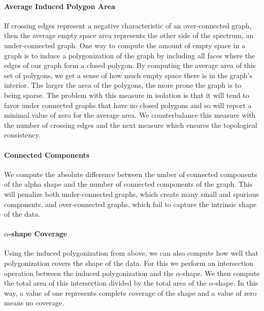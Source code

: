 \paragraph{\textbf{Average Induced Polygon Area}} If crossing edges represent a negative characteristic of an over-connected graph, then the average empty space area represents the other side of the spectrum, an under-connected graph.
%
One way to compute the amount of empty space in a graph is to induce a polygonization of the graph by including all faces where the edges of our graph form a closed polygon.
%
%
By computing the average area of this set of polygons, we get a sense of how much empty space there is in the graph's interior.
%
The larger the area of the polygons, the more prone the graph is to being sparse.
%
The problem with this measure in isolation is that it will tend to favor under connected graphs that have no closed polygons and so will report a minimal value of zero for the average area.
%
We counterbalance this measure with the number of crossing edges and the next measure which ensures the topological consistency.

\paragraph{\textbf{Connected Components}} We compute the absolute difference between the  umber of connected components of the alpha shape and the number of connected components of the graph.
%
This will penalize both under-connected graphs, which create many small and spurious components, and over-connected graphs, which fail to capture the intrinsic shape of the data.

\paragraph{\textbf{$\alpha$-shape Coverage}} Using the induced polygonization from above, we can also compute how well that polygonization covers the shape of the data.
%
For this we perform an intersection operation between the induced polygonization and the $\alpha$-shape.
%
We then compute the total area of this intersection divided by the total area of the $\alpha$-shape.
%
In this way, a value of one represents complete coverage of the shape and a value of zero means no coverage.

